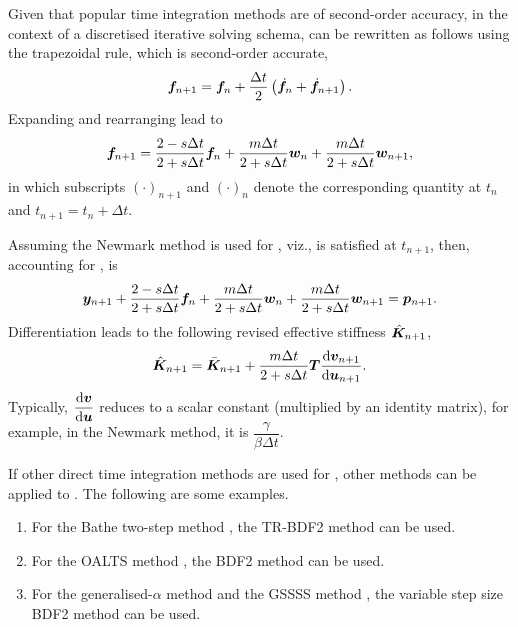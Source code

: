 Given that popular time integration methods are of second-order accuracy, in the context of a discretised iterative solving schema,  can be rewritten as follows using the trapezoidal rule, which is second-order accurate,
\begin{gather}
\bm{f}_{n+1}=\bm{f}_n+\dfrac{\Delta{}t}{2}\left(\dot{\bm{f}}_n+\dot{\bm{f}}_{n+1}\right).
\end{gather}
Expanding and rearranging lead to
\begin{gather}\label{eq:discretised_c}
\bm{f}_{n+1}=\dfrac{2-s\Delta{}t}{2+s\Delta{}t}\bm{f}_n+\dfrac{m\Delta{}t}{2+s\Delta{}t}\bm{w}_n+\dfrac{m\Delta{}t}{2+s\Delta{}t}\bm{w}_{n+1},
\end{gather}
in which subscripts $\left(\cdot\right)_{n+1}$ and $\left(\cdot\right)_n$ denote the corresponding quantity at $t_n$ and $t_{n+1}=t_n+\Delta{}t$.

Assuming the Newmark method is used for , viz.,  is satisfied at $t_{n+1}$, then, accounting for ,  is
\begin{gather}\label{eq:residual}
\bm{y}_{n+1}+\dfrac{2-s\Delta{}t}{2+s\Delta{}t}\bm{f}_n+\dfrac{m\Delta{}t}{2+s\Delta{}t}\bm{w}_n+\dfrac{m\Delta{}t}{2+s\Delta{}t}\bm{w}_{n+1}=\bm{p}_{n+1}.
\end{gather}
Differentiation leads to the following revised effective stiffness $\hat{\bm{K}}_{n+1}$,
\begin{gather}\label{eq:revised_k}
\hat{\bm{K}}_{n+1}=\bar{\bm{K}}_{n+1}+\dfrac{m\Delta{}t}{2+s\Delta{}t}\bm{T}\dfrac{\mathrm{d}\bm{v}_{n+1}}{\mathrm{d}\bm{u}_{n+1}}.
\end{gather}
Typically, $\dfrac{\mathrm{d}\bm{v}}{\mathrm{d}\bm{u}}$ reduces to a scalar constant (multiplied by an identity matrix), for example, in the Newmark method, it is $\dfrac{\gamma}{\beta\Delta{}t}$.
\begin{rmk}
If other direct time integration methods are used for , other methods can be applied to . The following are some examples.
\begin{enumerate}
\item For the Bathe two-step method \citep{Noh2019}, the TR-BDF2 method \citep{Bank1985} can be used.
\item For the OALTS method \citep{Zhang2021}, the BDF2 method can be used.
\item For the generalised-$\alpha$ method \citep{Chung1993} and the GSSSS method \citep{Zhou2003}, the variable step size BDF2 method can be used.
\end{enumerate}
\end{rmk}

